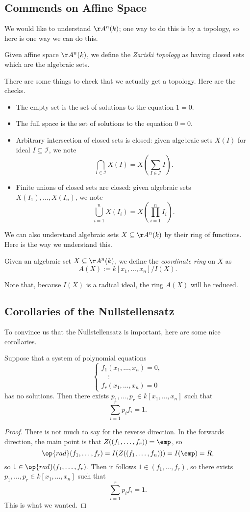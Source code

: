 \subsection{Commends on Affine Space}
We would like to understand $\AA^n(k)$; one way to do this is by a topology, so here is one way we can do this.
\begin{definition}
	Given affine space $\AA^n(k)$, we define the \textit{Zariski topology} as having closed sets which are the algebraic sets.
\end{definition}
There are some things to check that we actually get a topology. Here are the checks.
\begin{itemize}
	\item The empty set is the set of solutions to the equation $1=0$.
	\item The full space is the set of solutions to the equation $0=0$.
	\item Arbitrary intersection of closed sets is closed: given algebraic sets $X(I)$ for ideal $I\subseteq\mathcal I$, we note
	\[\bigcap_{I\in\mathcal I}X(I)=X\left(\sum_{I\in\mathcal I}I\right).\]
	\item Finite unions of closed sets are closed: given algebraic sets $X(I_1),\ldots,X(I_n)$, we note
	\[\bigcup_{i=1}^nX(I_i)=X\left(\prod_{i=1}^nI_i\right).\]
\end{itemize}
We can also understand algebraic sets $X\subseteq\AA^n(k)$ by their ring of functions. Here is the way we understand this.
\begin{definition}
	Given an algebraic set $X\subseteq\AA^n(k)$, we define the \textit{coordinate ring} on $X$ as
	\[A(X):=k[x_1,\ldots,x_n]/I(X).\]
\end{definition}
Note that, because $I(X)$ is a radical ideal, the ring $A(X)$ will be reduced.

\subsection{Corollaries of the Nullstellensatz}
To convince us that the Nullstellensatz is important, here are some nice corollaries.
\begin{corollary}
	Suppose that a system of polynomial equations
	\[\begin{cases}
		f_1(x_1,\ldots,x_n) = 0, \\
		\quad\vdots \\
		f_r(x_1,\ldots,x_n) = 0
	\end{cases}\]
	has no solutions. Then there exists $p_1,\ldots,p_r\in k[x_1,\ldots,x_n]$ such that
	\[\sum_{i=1}^rp_if_i=1.\]
\end{corollary}
\begin{proof}
	There is not much to say for the reverse direction. In the forwards direction, the main point is that $Z((f_1,\ldots,f_r))=\emp$, so
	\[\op{rad}(f_1,\ldots,f_r)=I(Z((f_1,\ldots,f_n)))=I(\emp)=R,\]
	so $1\in\op{rad}(f_1,\ldots,f_r)$. Then it follows $1\in(f_1,\ldots,f_r)$, so there exists $p_1,\ldots,p_r\in k[x_1,\ldots,x_n]$ such that
	\[\sum_{i=1}^rp_if_i=1.\]
	This is what we wanted.
\end{proof}

